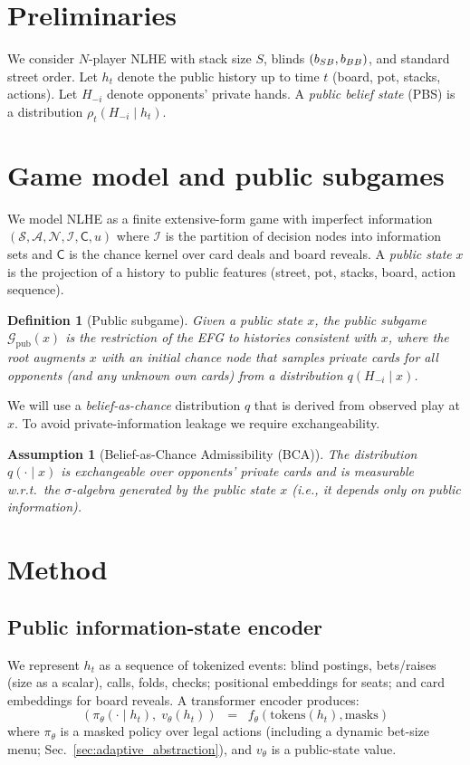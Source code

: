 \documentclass[10pt]{article}
\newcommand{\States}{\mathcal{S}}
\newcommand{\Actions}{\mathcal{A}}
\newcommand{\IS}{\mathcal{I}}
\newcommand{\Players}{\mathcal{N}}
\newcommand{\Chance}{\mathsf{C}}
\newcommand{\1}{\mathbf{1}}
\theoremstyle{plain}
\newtheorem{definition}{Definition}
\newtheorem{assumption}{Assumption}
\begin{document}
\section{Preliminaries}
We consider $N$-player NLHE with stack size $S$, blinds $(b_{\small SB},b_{\small BB})$, and standard street order. Let $h_t$ denote the public history up to time $t$ (board, pot, stacks, actions). Let $H_{-i}$ denote opponents' private hands. A \emph{public belief state} (PBS) is a distribution $\rho_t(H_{-i}\mid h_t)$.

\section{Game model and public subgames}
\label{sec:public_subgames}
We model NLHE as a finite extensive-form game with imperfect information $(\States,\Actions,\Players,\IS,\Chance,u)$ where $\IS$ is the partition of decision nodes into information sets and $\Chance$ is the chance kernel over card deals and board reveals. A \emph{public state} $x$ is the projection of a history to public features (street, pot, stacks, board, action sequence). 
\begin{definition}[Public subgame]
Given a public state $x$, the \emph{public subgame} $\mathcal{G}_{\text{pub}}(x)$ is the restriction of the EFG to histories consistent with $x$, where the root augments $x$ with an initial \emph{chance node} that samples private cards for all opponents (and any unknown own cards) from a distribution $q(H_{-i}\mid x)$.
\end{definition}
We will use a \emph{belief-as-chance} distribution $q$ that is derived from observed play at $x$. To avoid private-information leakage we require exchangeability.
\begin{assumption}[Belief-as-Chance Admissibility (BCA)]
\label{ass:bca}
The distribution $q(\cdot\mid x)$ is \emph{exchangeable} over opponents' private cards and is measurable w.r.t.\ the $\sigma$-algebra generated by the public state $x$ (i.e., it depends only on public information).
\end{assumption}

\section{Method}
\subsection{Public information-state encoder}
We represent $h_t$ as a sequence of tokenized events: blind postings, bets/raises (size as a scalar), calls, folds, checks; positional embeddings for seats; and card embeddings for board reveals. A transformer encoder produces:
\[
(\pi_\theta(\cdot\mid h_t),\; v_\theta(h_t)) \;\;=\;\; f_\theta(\text{tokens}(h_t), \text{masks})
\]
where $\pi_\theta$ is a masked policy over legal actions (including a dynamic bet-size menu; Sec.~\ref{sec:adaptive_abstraction}), and $v_\theta$ is a public-state value.
\end{document}

